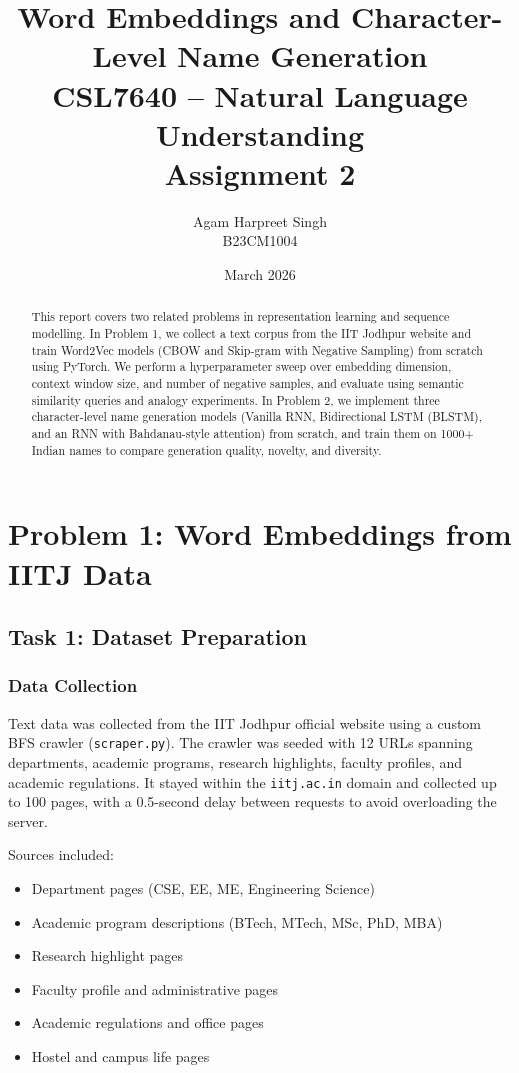 \documentclass[11pt, a4paper]{article}
\title{\textbf{Word Embeddings and Character-Level Name Generation} \\ \large CSL7640 -- Natural Language Understanding \\ Assignment 2}
\author{Agam Harpreet Singh \\ B23CM1004}
\date{March 2026}
\begin{document}
\maketitle
\thispagestyle{empty}

\begin{abstract}
This report covers two related problems in representation learning and sequence modelling.
In Problem 1, we collect a text corpus from the IIT Jodhpur website and train Word2Vec models (CBOW and Skip-gram with Negative Sampling) from scratch using PyTorch. We perform a hyperparameter sweep over embedding dimension, context window size, and number of negative samples, and evaluate using semantic similarity queries and analogy experiments. In Problem 2, we implement three character-level name generation models (Vanilla RNN, Bidirectional LSTM (BLSTM), and an RNN with Bahdanau-style attention) from scratch, and train them on 1000+ Indian names to compare generation quality, novelty, and diversity.
\end{abstract}

\newpage
\tableofcontents
\newpage

\section{Problem 1: Word Embeddings from IITJ Data}

\subsection{Task 1: Dataset Preparation}

\subsubsection{Data Collection}

Text data was collected from the IIT Jodhpur official website using a custom BFS crawler (\texttt{scraper.py}). The crawler was seeded with 12 URLs spanning departments, academic programs, research highlights, faculty profiles, and academic regulations. It stayed within the \texttt{iitj.ac.in} domain and collected up to 100 pages, with a 0.5-second delay between requests to avoid overloading the server.

Sources included:
\begin{itemize}[noitemsep]
    \item Department pages (CSE, EE, ME, Engineering Science)
    \item Academic program descriptions (BTech, MTech, MSc, PhD, MBA)
    \item Research highlight pages
    \item Faculty profile and administrative pages
    \item Academic regulations and office pages
    \item Hostel and campus life pages
\end{itemize}
\end{document}
